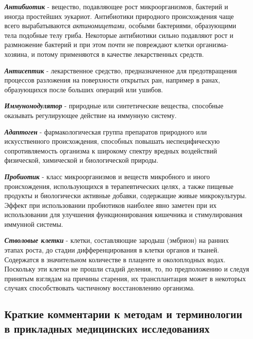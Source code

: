 \noindent
\textbf{ \textit{Антибиотик} } -  вещество, подавляющее рост микроорганизмов, бактерий и иногда простейших эукариот. Антибиотики природного происхождения чаще всего вырабатываются \textit{актиномицетами}, особыми бактериями, образующими тела подобные телу гриба. Некоторые антибиотики сильно подавляют рост и размножение бактерий и при этом почти не повреждают клетки организма-хозяина, и потому применяются в качестве лекарственных средств.

\noindent
\textbf{ \textit{Антисептик} } - лекарственное средство, предназначенное для предотвращения процессов разложения на поверхности открытых ран, например в ранах, образующихся после больших операций или ушибов.

\noindent
\textbf{ \textit{Иммуномодулятор} } - природные или синтетические вещества, способные оказывать регулирующее действие на иммунную систему.

\noindent
\textbf{ \textit{Адаптоген} } - фармакологическая группа препаратов природного или искусственного происхождения, способных повышать неспецифическую сопротивляемость организма к широкому спектру вредных воздействий физической, химической и биологической природы.

\noindent
\textbf{ \textit{Пробиотик} } - класс микроорганизмов и веществ микробного и иного происхождения, использующихся в терапевтических целях, а также пищевые продукты и биологически активные добавки, содержащие живые микрокультуры. Эффект при использовании пробиотиков наиболее явно заметен при их использовании для улучшения функционирования кишечника и стимулирования иммунной системы.

\noindent
\textbf{ \textit{Стволовые клетки} } - клетки, составляющие зародыш (эмбрион) на ранних этапах роста, до стадии дифференцирования в клетки органов и тканей. Содержатся в значительном количестве в плаценте и околоплодных водах. Поскольку эти клетки не прошли стадий деления, то, по предположению и следуя принятым взглядам на причины старения, их трансплантация может в некоторых случаях способствовать частичному восстановлению организма.

\subsection{Краткие комментарии к методам и терминологии в прикладных медицинских исследованиях} \label{sect_medicine_comments}


